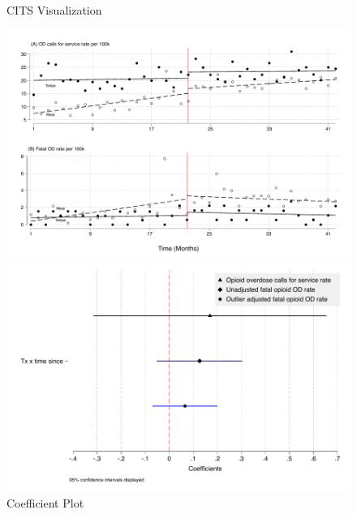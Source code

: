 \newpage





 

  
\newpage


\begin{figure}
\begin{minipage}{1 \textwidth}
    \centering
    \caption{\centering CITS Visualization}
    \includegraphics{figures/itsa-combined.pdf}
\end{minipage}
\begin{minipage}{1 \textwidth}
    \centering
    \caption{\centering Coefficient Plot}
    \includegraphics{figures/coefplot.pdf}
\end{minipage}
\end{figure}



